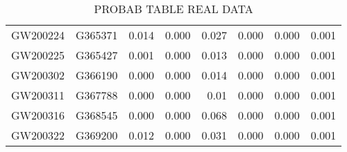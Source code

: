 \begin{table}[]
\begin{tabular}{c|c|ccr|ccr}
GW200224                      & G365371               & 0.014                   & 0.000                    & 0.027                   & 0.000                   & 0.000                    & 0.001                   \\
GW200225                      & G365427               & 0.001                   & 0.000                    & 0.013                   & 0.000                   & 0.000                    & 0.001                   \\
GW200302                      & G366190               & 0.000                   & 0.000                    & 0.014                   & 0.000                   & 0.000                    & 0.001                   \\
GW200311                      & G367788               & 0.000                   & 0.000                    & 0.01                    & 0.000                   & 0.000                    & 0.001                   \\
GW200316                      & G368545               & 0.000                   & 0.000                    & 0.068                   & 0.000                   & 0.000                    & 0.001                   \\
GW200322                      & G369200               & 0.012                   & 0.000                    & 0.031                   & 0.000                   & 0.000                    & 0.001                   \\ \cline{1-1} \cline{3-4} \cline{6-7}
\hline
\end{tabular}
\caption{PROBAB TABLE REAL DATA}
\label{tab:real_data}
\end{table}



